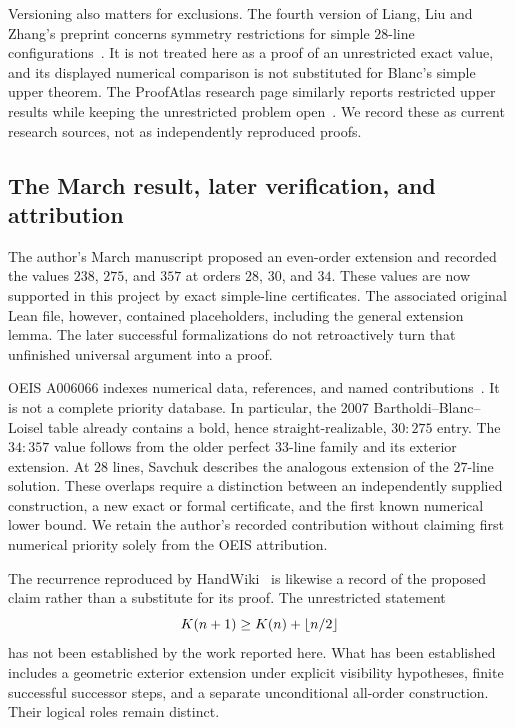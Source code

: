 Versioning also matters for exclusions. The fourth version of Liang, Liu and Zhang's preprint concerns symmetry restrictions for simple $28$-line configurations~\citep{liangliuZhang2026}. It is not treated here as a proof of an unrestricted exact value, and its displayed numerical comparison is not substituted for Blanc's simple upper theorem. The ProofAtlas research page similarly reports restricted upper results while keeping the unrestricted problem open~\citep{proofatlas2026}. We record these as current research sources, not as independently reproduced proofs.

\subsection{The March result, later verification, and attribution}

The author's March manuscript proposed an even-order extension and recorded the values $238$, $275$, and $357$ at orders $28$, $30$, and $34$\citep{zarzuelo2026}. These values are now supported in this project by exact simple-line certificates. The associated original Lean file, however, contained placeholders, including the general extension lemma. The later successful formalizations do not retroactively turn that unfinished universal argument into a proof.

OEIS A006066 indexes numerical data, references, and named contributions~\citep{oeisA006066}. It is not a complete priority database. In particular, the 2007 Bartholdi--Blanc--Loisel table already contains a bold, hence straight-realizable, $30{:}275$ entry. The $34{:}357$ value follows from the older perfect $33$-line family and its exterior extension. At $28$ lines, Savchuk describes the analogous extension of the $27$-line solution. These overlaps require a distinction between an independently supplied construction, a new exact or formal certificate, and the first known numerical lower bound. We retain the author's recorded contribution without claiming first numerical priority solely from the OEIS attribution.

The recurrence reproduced by HandWiki~\citep{handwiki2026} is likewise a record of the proposed claim rather than a substitute for its proof. The unrestricted statement
\[
 K(n+1)\ge K(n)+\left\lfloor n/2\right\rfloor
\]
has not been established by the work reported here. What has been established includes a geometric exterior extension under explicit visibility hypotheses, finite successful successor steps, and a separate unconditional all-order construction. Their logical roles remain distinct.

